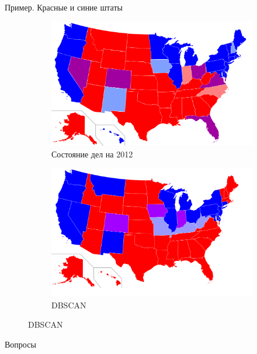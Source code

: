 \documentclass[aspectratio=169]{beamer}
\begin{document}
\begin{frame}{Пример. Красные и синие штаты}

\begin{center}
\begin{figure}
\begin{subfigure}[b]{.45\linewidth}
\includegraphics[width=1.0\textwidth]{images/redblue.png}
\caption{Состояние дел на 2012}
\end{subfigure}
\begin{subfigure}[b]{.45\linewidth}
\includegraphics[width=1.0\textwidth]{images/map_db.png}
\caption{DBSCAN}
\end{subfigure}
\end{figure}
\end{center}

\end{frame}

\begin{frame}[plain]
\begin{center}
{\Large Вопросы}
\end{center}
\end{frame}
\end{document}
